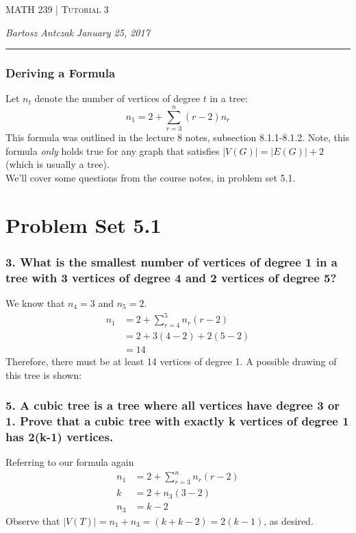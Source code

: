 \documentclass{report}
\newcommand{\lectureNum}{3}
\newcommand{\curDate}{January 25, 2017}
\newcommand{\course}{MATH 239}
\begin{document}
\begin{center}
\begin{Large}
\textsc{\course{} | Tutorial \lectureNum{}}
\end{Large}
\end{center} 
\noindent \textit{Bartosz Antczak} \hfill
\textit{\curDate{}}
\rule{\textwidth}{0.4pt}
\subsubsection{Deriving a Formula}
Let $n_t$ denote the number of vertices of degree $t$ in a tree:
$$n_1 = 2 + \sum_{r = 3}^n (r-2)n_r$$
This formula was outlined in the lecture 8 notes, subsection 8.1.1-8.1.2. Note, this formula \textit{only} holds true for any graph that satisfies $\vert V(G) \vert = \vert E(G) \vert  + 2$ (which is usually a tree).\\
We'll cover some questions from the course notes, in problem set 5.1.
\section{Problem Set 5.1}
\subsubsection{3. What is the smallest number of vertices of degree 1 in a tree with 3 vertices of degree 4 and 2 vertices of degree 5?}
We know that $n_4 = 3$ and $n_5 = 2$.
\begin{align}
n_1 &= 2 + \sum_{r = 4}^5 n_r(r-2) \\
&= 2 + 3(4-2) + 2(5-2)\\
&= 14
\end{align}
Therefore, there must be at least 14 vertices of degree 1. A possible drawing of this tree is shown:
\subsubsection{5. A cubic tree is a tree where all vertices have degree 3 or 1. Prove that a cubic tree with exactly k vertices of degree 1 has 2(k-1) vertices.}
Referring to our formula again
\begin{align}
n_1 &= 2 + \sum_{r = 3}^n n_r(r-2) \\
k &= 2 + n_3(3-2) \\
n_3 &= k-2
\end{align}
Observe that $\vert V(T) \vert = n_1 + n_3 = (k + k - 2) = 2(k-1)$, as desired.
\end{document}
